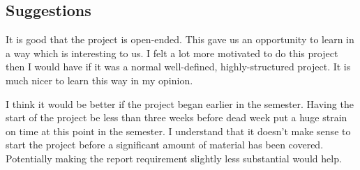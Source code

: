 \documentclass{article} %
\begin{document}
\subsection{Suggestions}
It is good that the project is open-ended.
This gave us an opportunity to learn in a way which is interesting to us.
I felt a lot more motivated to do this project then I would have if it was a normal well-defined, highly-structured project.
It is much nicer to learn this way in my opinion.

I think it would be better if the project began earlier in the semester.
Having the start of the project be less than three weeks before dead week put a huge strain on time at this point in the semester.
I understand that it doesn't make sense to start the project before a significant amount of material has been covered.
Potentially making the report requirement slightly less substantial would help.



\end{document}
